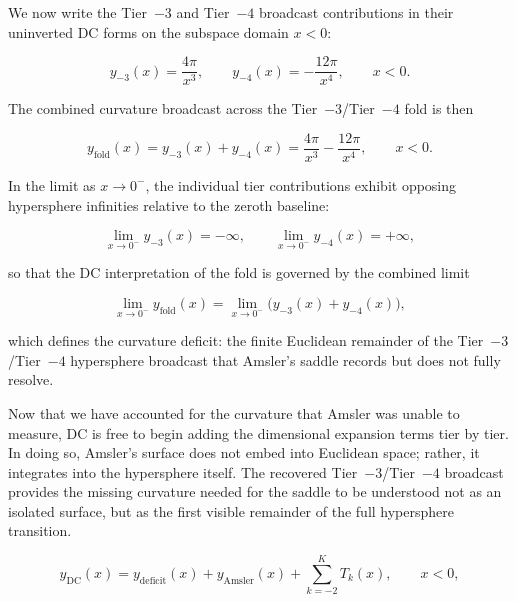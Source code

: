 \documentclass[final,onefignum,onetabnum]{siamart}
\begin{document}
We now write the Tier~$-3$ and Tier~$-4$ broadcast contributions in their uninverted DC forms on the subspace domain $x<0$:

\begin{equation}
    y_{-3}(x) = \frac{4\pi}{x^{3}}, 
    \qquad
    y_{-4}(x) = -\frac{12\pi}{x^{4}},
    \qquad x<0.
\end{equation}

The combined curvature broadcast across the Tier~$-3$/Tier~$-4$ fold is then

\begin{equation}
    y_{\mathrm{fold}}(x)
    = y_{-3}(x) + y_{-4}(x)
    = \frac{4\pi}{x^{3}} - \frac{12\pi}{x^{4}},
    \qquad x<0.
\end{equation}

In the limit as $x\to 0^{-}$, the individual tier contributions exhibit opposing hypersphere infinities relative to the zeroth baseline:

\begin{equation}
    \lim_{x\to 0^{-}} y_{-3}(x) = -\infty,
    \qquad
    \lim_{x\to 0^{-}} y_{-4}(x) = +\infty,
\end{equation}

so that the DC interpretation of the fold is governed by the combined limit

\begin{equation}
    \lim_{x\to 0^{-}} y_{\mathrm{fold}}(x)
    = \lim_{x\to 0^{-}} \big( y_{-3}(x) + y_{-4}(x) \big),
\end{equation}

which defines the curvature deficit: the finite Euclidean remainder of the Tier~$-3$/Tier~$-4$ hypersphere broadcast that Amsler’s saddle records but does not fully resolve.

Now that we have accounted for the curvature that Amsler was unable to measure, DC is free to begin adding the dimensional expansion terms tier by tier. In doing so, Amsler’s surface does not embed into Euclidean space; rather, it integrates into the hypersphere itself. The recovered Tier~$-3$/Tier~$-4$ broadcast provides the missing curvature needed for the saddle to be understood not as an isolated surface, but as the first visible remainder of the full hypersphere transition.

\begin{equation}
    y_{\mathrm{DC}}(x)
    = y_{\mathrm{deficit}}(x)
    + y_{\mathrm{Amsler}}(x)
    + \sum_{k=-2}^{K} T_k(x),
    \qquad x<0,
\end{equation}
\end{document}
